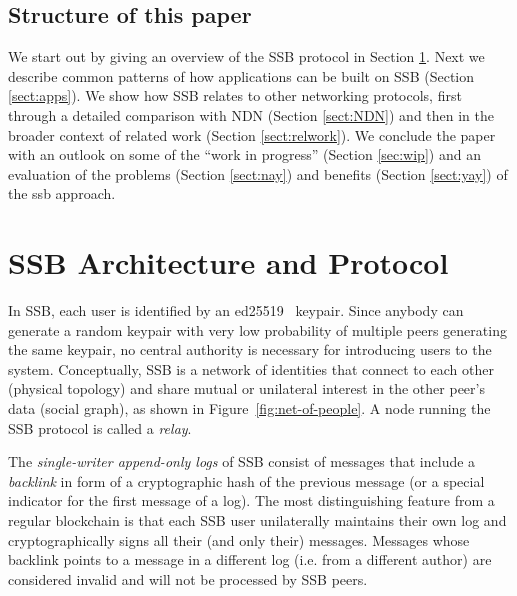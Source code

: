 \documentclass[9pt,sigconf,rewiew]{acmart}
\begin{document}
\subsection*{Structure of this paper}

We start out by giving an overview of the SSB protocol in Section \ref{sect:architecture}. Next we describe common patterns of how applications can be built on SSB (Section \ref{sect:apps}). We show how SSB relates to other networking protocols, first through a detailed comparison with NDN (Section \ref{sect:NDN}) and then in the broader context of related work (Section \ref{sect:relwork}). We conclude the paper with an outlook on some of the ``work in progress'' (Section \ref{sec:wip}) and an evaluation of the problems (Section \ref{sect:nay}) and benefits (Section \ref{sect:yay}) of the ssb approach.


\section{SSB Architecture and Protocol}
\label{sect:architecture}

In SSB, each user is identified by an ed25519~\cite{bernstein2012high} keypair. Since anybody can generate a random keypair with very low probability of multiple peers generating the same keypair, no central authority is necessary for introducing users to the system. Conceptually, SSB is a network of identities that connect to each other (physical topology) and share mutual or unilateral interest in the other peer's data (social graph), as shown in Figure~\ref{fig:net-of-people}. A node running the SSB protocol is called a \textit{relay}.

The {\em single-writer append-only logs} of SSB consist of  messages that include a {\em backlink} in form of a cryptographic hash of the previous message (or a special indicator for the first message of a log). The most distinguishing feature from a regular blockchain is that each SSB user unilaterally maintains their own log and cryptographically signs all their (and only their) messages. Messages whose backlink points to a message in a different log (i.e. from a different author) are considered invalid and will not be processed by SSB peers.

\end{document}
